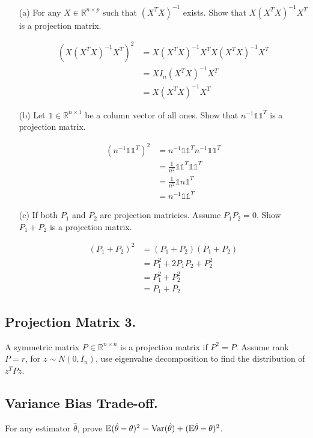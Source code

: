 \documentclass{tufte-book}
\begin{document}
\begin{enumerate}

\item[(a)] For any $X \in \mathbb{R}^{n \times p}$ such that $(X^TX)^{-1}$ exists.  Show that $X(X^TX)^{-1}X^T$ is a projection matrix.

\begin{align*}
(X(X^TX)^{-1}X^T)^2 &= X(X^TX)^{-1}X^TX(X^TX)^{-1}X^T\\
&= X I_n (X^TX)^{-1}X^T\\
&= X(X^TX)^{-1}X^T
\end{align*}

\item[(b)] Let $\mathbb{1} \in \mathbb{R}^{n \times 1}$ be a column vector of all ones.  Show that $n^{-1} \mathbb{1}\mathbb{1}^T$ is a projection matrix.

\begin{align*}
(n^{-1} \mathbb{1}\mathbb{1}^T)^2 &= n^{-1} \mathbb{1}\mathbb{1}^Tn^{-1} \mathbb{1}\mathbb{1}^T\\
&= \frac{1}{n^2} \mathbb{1}\mathbb{1}^T \mathbb{1}\mathbb{1}^T\\
&= \frac{1}{n^2} \mathbb{1}n\mathbb{1}^T\\
&= n^{-1} \mathbb{1}\mathbb{1}^T
\end{align*}

\item[(c)] If both $P_1$ and $P_2$ are projection matricies.  Assume $P_1P_2=0$.  Show $P_1+P_2$ is a projection matrix.

\begin{align*}
(P_1+P_2)^2 &= (P_1+P_2)(P_1+P_2)\\
&=P_1^2 + 2P_1P_2 + P_2^2\\
&=P_1^2 + P_2^2\\
&=P_1 + P_2
\end{align*}

\end{enumerate}

\subsection{Projection Matrix 3.} A symmetric matrix $P\in \mathbb{R}^{n\times n}$ is a projection matrix if $P^2=P$.  Assume rank$P=r$, for $z \sim N(0, I_n)$, use eigenvalue decomposition to find the distribution of $z^TPz$.


\subsection{Variance Bias Trade-off.}  For any estimator $\hat{\theta}$, prove $\mathbb{E}(\hat{\theta}-\theta)^2 = \operatorname{Var}(\hat{\theta})+ (\mathbb{E}\hat{\theta} - \theta)^2$.
\end{document}
